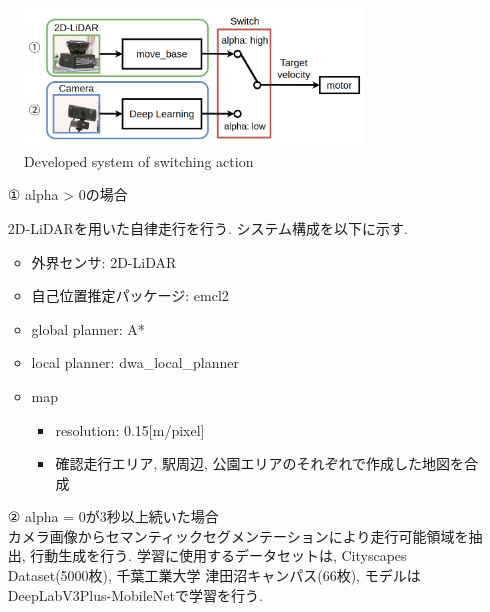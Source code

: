 \documentclass[uplatex, twocolumn, 9pt]{jsproceedings}
\begin{document}
\begin{figure}[h]
  \centering
  \includegraphics[width=90mm]{fig/switching3.pdf}
  \caption{Developed system of switching action}
  \label{fig:switching}%
\end{figure}

\begin{itemize}
  \item [①]alpha > 0の場合\par
  2D-LiDARを用いた自律走行を行う. システム構成を以下に示す. 
  \begin{itemize}
    \item 外界センサ: 2D-LiDAR
    \item 自己位置推定パッケージ: emcl2
    \item global planner: A*
    \item local planner: dwa\_local\_planner
    \item map
    \begin{itemize}
      \item resolution: 0.15[m/pixel]
      \item 確認走行エリア, 駅周辺, 公園エリアのそれぞれで作成した地図を合成
    \end{itemize}
  \end{itemize}
  \item [②]alpha = 0が3秒以上続いた場合\\
  カメラ画像からセマンティックセグメンテーション\cite{Deeplab}により走行可能領域を抽出, 行動生成を行う. 学習に使用するデータセットは, Cityscapes Dataset\cite{cityscapes}(5000枚), 千葉工業大学 津田沼キャンパス(66枚), モデルはDeepLabV3Plus-MobileNetで学習を行う.
\end{itemize}
\end{document}
